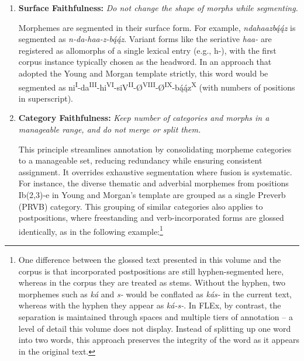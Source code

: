 \begin{enumerate}
    \item \textbf{Surface Faithfulness:} \textit{Do not change the shape of morphs while segmenting.}
    
    Morphemes are segmented in their surface form. For example, \textit{ndahaazbą́ą́z} is segmented as \textit{n-da-haa-z-bą́ą́z}. Variant forms like the seriative \textit{haa-} are registered as allomorphs of a single lexical entry (e.g., h-), with the first corpus instance typically chosen as the headword. In an approach that adopted the Young and Morgan template strictly, this word would be segmented as ni\textsuperscript{I}-da\textsuperscript{III}-hi\textsuperscript{VI}-siV\textsuperscript{II}-Ø\textsuperscript{VIII}-Ø\textsuperscript{IX}-bą́ą́z\textsuperscript{X} (with numbers of positions in superscript).
    \item \textbf{Category Faithfulness:} \textit{Keep number of categories and morphs in a manageable range, and do not merge or split them.}

    This principle streamlines annotation by consolidating morpheme categories to a manageable set, reducing redundancy while ensuring consistent assignment. It overrides exhaustive segmentation where fusion is systematic. For instance, the diverse thematic and adverbial morphemes from positions Ib(2,3)-e in Young and Morgan's template are grouped as a single Preverb (PRVB) category. This grouping of similar categories also applies to postpositions, where freestanding and verb-incorporated forms are glossed identically, as in the following example:\footnote{One difference between the glossed text presented in this volume and the corpus is that incorporated postpositions are still hyphen-segmented here, whereas in the corpus they are treated as stems. Without the hyphen, two morphemes such as \textit {ká} and \textit{s-} would be conflated as \textit{kás-} in the current text, whereas with the hyphen they appear as \textit{ká-s-}. In FLEx, by contrast, the separation is maintained through spaces and multiple tiers of annotation -- a level of detail this volume does not display. Instead of splitting up one word into two words, this approach preserves the integrity of the word as it appears in the original text.}


\end{enumerate}
